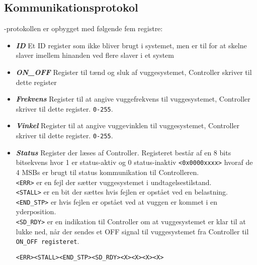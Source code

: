\subsection{Kommunikationsprotokol}

\iic-protokollen er opbygget med følgende fem registre:

\begin{itemize}
\item \textbf{\textit{ID}} Et ID register som ikke bliver brugt i systemet, men er til for at skelne \iic slaver imellem hinanden ved flere slaver i et system
\item \textbf{\textit{ON\_OFF}} Register til tænd og sluk af vuggesystemet, Controller skriver til dette register
\item \textbf{\textit{Frekvens}} Register til at angive vuggefrekvens til vuggesystemet, Controller skriver til dette register. \verb+0-255+.
\item \textbf{\textit{Vinkel}} Register til at angive vuggevinklen til vuggesystemet, Controller skriver til dette register. \verb+0-255+.
\item \textbf{\textit{Status}} Register der læses af Controller. Registeret består af en 8 bits bitsekvens hvor 1 er status-aktiv og 0 status-inaktiv \verb+<0x0000xxxx>+ hvoraf de 4 MSBs er brugt til status kommunikation til Controlleren.\\ 
\verb+<ERR>+ er en fejl der sætter vuggesystemet i undtagelsestilstand. \\
\verb+<STALL>+ er en bit der sættes hvis fejlen er opstået ved en belastning. \\
\verb+<END_STP>+ er hvis fejlen er opstået ved at vuggen er kommet i en yderposition. \\
\verb+<SD_RDY>+ er en indikation til Controller om at vuggesystemet er klar til at lukke ned, når der sendes et OFF signal til vuggesystemet fra Controller til \verb+ON_OFF registeret+. 
\begin{center}
\verb+<ERR><STALL><END_STP><SD_RDY><X><X><X><X>+
\end{center}
\end{itemize}

